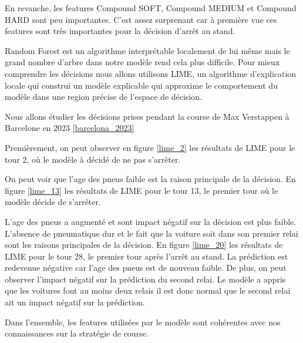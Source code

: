 En revanche, les features Compound SOFT, Compound MEDIUM et Compound HARD sont peu importantes.
C'est assez surprenant car à première vue ces features sont très importantes pour la décision d'arrêt au stand.

Random Forest est un algorithme interprétable localement de lui même mais le grand nombre d'arbre dans notre modèle rend cela plus difficile.
Pour mieux comprendre les décisions nous allons utilisons LIME, un algorithme d'explication locale qui construi un modèle explicable qui approxime le comportement du modèle dans une region précise de l'espace de décision.

Nous allons étudier les décisions prises pendant la course de Max Verstappen à Barcelone en 2023 \ref{barcelona_2023}

Premièrement, on peut observer en figure \ref{lime_2} les résultats de LIME pour le tour 2, où le modèle à décidé de ne pas s'arrêter.

On peut voir que l'age des pneus faible est la raison principale de la décision. En figure \ref{lime_13} les résultats de LIME pour le tour 13, le premier tour où le modèle décide de s'arrêter.

L'age des pneus a augmenté et sont impact négatif sur la décision est plus faible. L'absence de pneumatique dur et le fait que la voiture soit dans son
premier relai sont les raisons principales de la décision. En figure \ref{lime_20} les résultats de LIME pour le tour 28, le premier tour après l'arrêt au stand.
La prédiction est redevenue négative car l'age des pneus est de nouveau faible. De plus, on peut observer l'impact négatif sur la prédiction du second relai.
Le modèle a appris que les voitures font au moins deux relais il est donc normal que le second relai ait un impact négatif sur la prédiction.

Dans l'ensemble, les features utilisées par le modèle sont cohérentes avec nos connaissances sur la stratégie de course.


